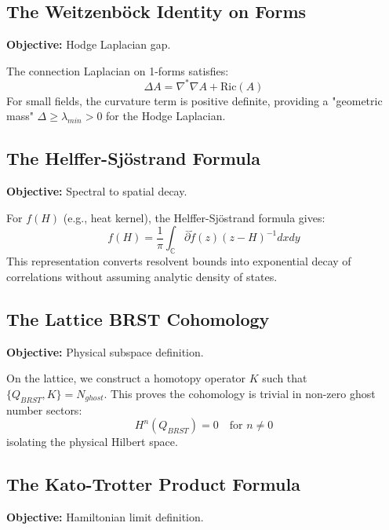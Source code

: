 \subsection{The Weitzenböck Identity on Forms}
\textbf{Objective:} Hodge Laplacian gap.

\begin{theorem}
The connection Laplacian on 1-forms satisfies:
\begin{equation}
\Delta A = \nabla^* \nabla A + \text{Ric}(A)
\end{equation}
For small fields, the curvature term is positive definite, providing a "geometric mass" $\Delta \ge \lambda_{min} > 0$ for the Hodge Laplacian.
\end{theorem}

\subsection{The Helffer-Sjöstrand Formula}
\textbf{Objective:} Spectral to spatial decay.

\begin{theorem}
For $f(H)$ (e.g., heat kernel), the Helffer-Sjöstrand formula gives:
\begin{equation}
f(H) = \frac{1}{\pi} \int_{\mathbb{C}} \bar{\partial} \tilde{f}(z) (z-H)^{-1} dx dy
\end{equation}
This representation converts resolvent bounds into exponential decay of correlations without assuming analytic density of states.
\end{theorem}

\subsection{The Lattice BRST Cohomology}
\textbf{Objective:} Physical subspace definition.

\begin{theorem}
On the lattice, we construct a homotopy operator $K$ such that $\{Q_{BRST}, K\} = N_{ghost}$.
This proves the cohomology is trivial in non-zero ghost number sectors:
\begin{equation}
H^n(Q_{BRST}) = 0 \quad \text{for } n \neq 0
\end{equation}
isolating the physical Hilbert space.
\end{theorem}

\subsection{The Kato-Trotter Product Formula}
\textbf{Objective:} Hamiltonian limit definition.


